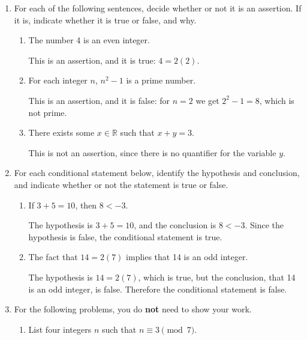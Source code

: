 \documentclass[12pt]{article}
\newcommand{\points}[1]{\marginpar{\hspace{24pt}[#1]}}
\newcommand{\R}{\mathbb{R}}
\begin{document}
\begin{enumerate}
\item For each of the following sentences, decide whether or not it is an assertion. If it is, indicate whether it is true or false, and why.
\begin{enumerate}
\item The number 4 is an even integer. \points{2}

\bigskip

This is an assertion, and it is true: $4=2(2)$.

\bigskip

\item For each integer $n$, $n^2-1$ is a prime number.\points{2}

\bigskip

This is an assertion, and it is false: for $n=2$ we get $2^2-1=8$, which is not prime.

\bigskip


\item There exists some $x\in\R$ such that $x+y=3$. \points{2}

\bigskip

This is not an assertion, since there is no quantifier for the variable $y$.

\bigskip
\end{enumerate}

\item For each conditional statement below, identify the hypothesis and conclusion, and indicate whether or not the statement is true or false.
\begin{enumerate}
\item If $3+5=10$, then $8<-3$. \points{2}

\bigskip

The hypothesis is $3+5=10$, and the conclusion is $8<-3$. Since the hypothesis is false, the conditional statement is true.

\bigskip

\item The fact that $14=2(7)$ implies that 14 is an odd integer. \points{2}

\bigskip

The hypothesis is $14=2(7)$, which is true, but the conclusion, that 14 is an odd integer, is false. Therefore the conditional statement is false.
\end{enumerate}
\newpage

\item For the following problems, you do {\bf not} need to show your work.
\begin{enumerate}
\item List four integers $n$ such that $n\equiv 3 \pmod{7}$. \points{2}


\end{enumerate}
\end{enumerate}
\end{document}
